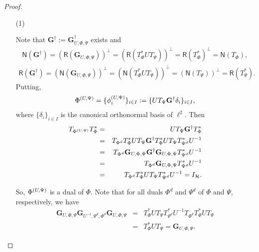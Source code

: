 \documentclass{birkjour}
\theoremstyle{definition}
\theoremstyle{remark}
\numberwithin{equation}{section}
\newcommand{\range}[1]{\mathsf{R}\left( #1 \right)}
\newcommand{\kernel}[1]{\mathsf{N}\left( #1 \right)}
\begin{document}
\begin{proof}
\begin{enumerate}
\item[(1)]

Note that $\mathbf{G}^{\dag}:=\mathbf{G}_{U,\Phi,\Psi}^{\dag}$
exists and
\begin{eqnarray}\label{salib1}
\kernel{\mathbf{G}^{\dag}}=\left(\range{\mathbf{G}_{U,\Phi,\Psi}}\right)^{\perp}=\left(\range{T_{\Phi}^{*}UT_{\Psi}}\right)^{\perp}=\range{T_{\Phi}^{*}}^{\perp}=
\kernel{T_{\Phi}},
\end{eqnarray}
\begin{eqnarray}\label{salib2}
\range{\mathbf{G}^{\dag}}=\left(\kernel{\mathbf{G}_{U,\Phi, \Psi}}\right)^{\perp}=\left(\kernel{T_{\Phi}^{*}UT_{\Psi}}
\right)^{\perp}=\left(\kernel{T_{\Psi}}
\right)^{\perp}=\range{T_{\Psi}^{*}}.
\end{eqnarray}
\def\phisd{\phi^1{o}}
\def\psisd{\psi^1{o}}
Putting,
\begin{eqnarray}\label{fi}
\Phi^{\left(U,\Psi\right)}=\{\phi_i^{(U,\Psi)}\}_{i\in
I}:=\{UT_{\Psi}\mathbf{G}^{\dag}\delta_{i}\}_{i\in I},
\end{eqnarray}
where $\{\delta_i\}_{i\in I}$ is the canonical orthonormal basis
of $\ell^2$. Then
\begin{eqnarray*}
T_{\Phi^{\left(U,\Psi\right)}}T_{\Phi}^*&=&UT_{\Psi}\mathbf{G}^{\dag}T_{\Phi}^{*}\\
 &=&T_{\Phi^d}T_{\Phi}^*UT_{\Psi}\mathbf{G}^{\dag}T_{\Phi}^{*}UT_{\Psi}T_{\Psi^d}^*U^{-1}\\
 &=&T_{\Phi^d}\mathbf{G}_{U,\Phi,\Psi}\mathbf{G}^{\dag}\mathbf{G}_{U,\Phi,\Psi}T_{\Psi^d}^*U^{-1}\\
 &=&T_{\Phi^d}\mathbf{G}_{U,\Phi,\Psi}T_{\Psi^d}^*U^{-1}\\
 &=&T_{\Phi^d}T_{\Phi}^*UT_{\Psi}T_{\Psi^d}^*U^{-1}=I_{\mathcal{H}}.
\end{eqnarray*}

So, $\Phi^{\left(U,\Psi\right)}$ is a dual of $\Phi$.
Note that for all duals $\Phi^{d}$ and $\Psi^{d}$ of $\Phi$ and $\Psi$, respectively, we have
\begin{eqnarray*}
\mathbf{G}_{U,\Phi,\Psi}\mathbf{G}_{U^{-1},\Psi^{d},\Phi^{d}}\mathbf{G}_{U,\Phi,\Psi}& =&T_{\Phi}^{*}UT_{\Psi}T_{\Psi^d}^{*}U^{-1}T_{\Phi^d}T_{\Phi}^{*}UT_{\Psi}\\
&=&T_{\Phi}^{*}UT_{\Psi}=\mathbf{G}_{U,\Phi,\Psi}.
\end{eqnarray*}



\end{enumerate}
\end{proof}
\end{document}
